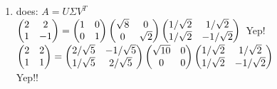 \documentclass[11pt]{article}
\begin{document}
\begin{enumerate}
\item	
	does:
	$A=U\Sigma V^T$\\
	$\begin{pmatrix} 2&2\\1&-1 \end{pmatrix} = \begin{pmatrix} 1&0\\0&1 \end{pmatrix} \begin{pmatrix} \sqrt{8}&0\\0&\sqrt{2} \end{pmatrix} \begin{pmatrix} 1/\sqrt{2}&1/\sqrt{2}\\1/\sqrt{2}&-1/\sqrt{2} \end{pmatrix}\\
	$
	Yep!\\
	$\begin{pmatrix} 2&2\\1&1 \end{pmatrix} = \begin{pmatrix} 2/\sqrt{5}&-1/\sqrt{5}\\1/\sqrt{5}&2/\sqrt{5} \end{pmatrix} \begin{pmatrix} \sqrt{10}&0\\0&0 \end{pmatrix} \begin{pmatrix} 1/\sqrt{2}&1/\sqrt{2}\\1/\sqrt{2}&-1/\sqrt{2} \end{pmatrix}\\
	$\\
	Yep!!
\end{enumerate}
\end{document}
